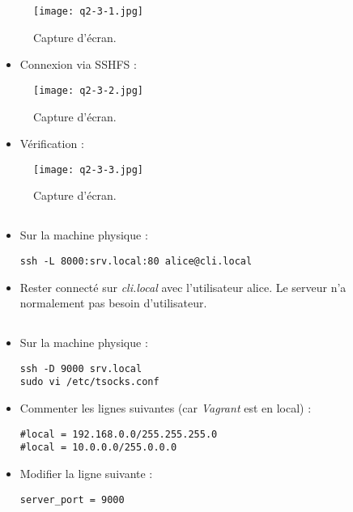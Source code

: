 \documentclass{article}
\begin{document}
\begin{figure}[h]
\centering
\texttt{[image: q2-3-1.jpg]}
\caption{\label{fig:frog}Capture d'écran.}
\end{figure}

\begin{itemize}
    \item Connexion via SSHFS :
\end{itemize}

\begin{figure}[h]
\centering
\texttt{[image: q2-3-2.jpg]}
\caption{\label{fig:frog}Capture d'écran.}
\end{figure}

\begin{itemize}
    \item Vérification :
\end{itemize}

\begin{figure}[h]
\centering
\texttt{[image: q2-3-3.jpg]}
\caption{\label{fig:frog}Capture d'écran.}
\end{figure}

\subsection{}

\begin{itemize}
\item Sur la machine physique :
\begin{lstlisting}
ssh -L 8000:srv.local:80 alice@cli.local
\end{lstlisting}
\item Rester connecté sur \emph{cli.local} avec l’utilisateur alice. Le serveur n’a normalement pas besoin d’utilisateur.
\end{itemize}

\subsection{}

\begin{itemize}
\item Sur la machine physique :
\begin{lstlisting}
ssh -D 9000 srv.local
sudo vi /etc/tsocks.conf
\end{lstlisting}
\item Commenter les lignes suivantes (car \emph{Vagrant} est en local) :
\begin{lstlisting}
#local = 192.168.0.0/255.255.255.0
#local = 10.0.0.0/255.0.0.0
\end{lstlisting}
\item Modifier la ligne suivante :
\begin{lstlisting}
server_port = 9000
\end{lstlisting}
\end{itemize}
\end{document}

